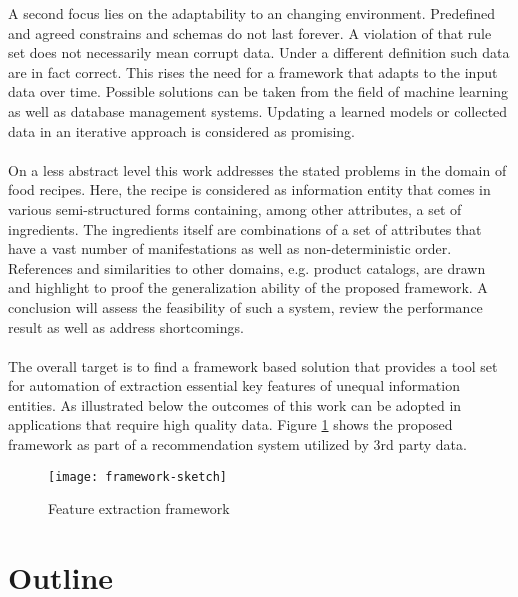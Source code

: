 A second focus lies on the adaptability to an changing environment. Predefined and agreed constrains and schemas do not last forever. A violation of that rule set does not necessarily mean corrupt data. Under a different definition such data are in fact correct. This rises the need for a framework that adapts to the input data over time. Possible solutions can be taken from the field of machine learning as well as database management systems. Updating a learned models or collected data in an iterative approach is considered as promising. 
\\\\
On a less abstract level this work addresses the stated problems in the domain of food recipes. Here, the recipe is considered as information entity that comes in various semi-structured forms containing, among other attributes, a set of ingredients. The ingredients itself are combinations of a  set of attributes that have a vast number of manifestations as well as non-deterministic order. References and similarities to other domains, e.g. product catalogs, are drawn and highlight to proof the generalization ability of the proposed framework. A conclusion will assess the feasibility of such a system, review the performance result as well as address shortcomings.
\\\\
The overall target is to find a framework based solution that provides a tool set for automation of extraction essential key features of unequal information entities. As illustrated below the outcomes of this work can be adopted in applications that require high quality data. Figure \ref{fig:framework-sketch} shows the proposed framework as part of a recommendation system utilized by 3rd party data.
\\
\begin{figure}[htb]
  \centering
  \texttt{[image: framework-sketch]}\\
  \caption{Feature extraction framework}\label{fig:framework-sketch}
\end{figure}

\section{Outline\label{sec:outline}}

